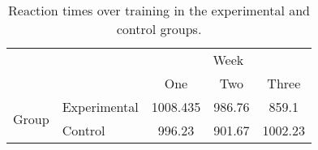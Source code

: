 \begin{table}[h!]
\centering
\caption{\label{tab:RTmeans}Reaction times over training in the experimental and control groups.}
\begin{tabular}{l l c c c}
 \toprule
                          &              & \multicolumn{3}{c}{Week}\\
  \cmidrule{3-5}
                          &              & {One}           & {Two}           & {Three}\\
  \cmidrule{3-5}
  \multirow{ 2}{*}{Group} & Experimental &     1008.435    &      986.76     &      859.1     \\
                          & Control      &     996.23      &      901.67     &      1002.23   \\
  \bottomrule
 \end{tabular}
\end{table}
